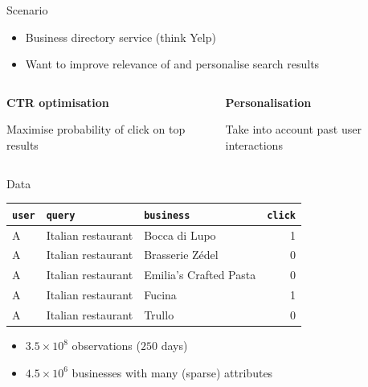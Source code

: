 \documentclass[12pt,aspectratio=169]{beamer}
\begin{document}
\begin{frame}{Scenario}
    \begin{itemize}
        \item Business directory service (think Yelp)
        \item Want to improve relevance of and personalise search results
    \end{itemize}
    \vfill\pause
    \begin{columns}
        \begin{column}{0.5\textwidth}
            \begin{center}
                \large\bf%
                CTR optimisation
            \end{center}
            Maximise probability of click on top results
        \end{column}
        \begin{column}{0.5\textwidth}
            \begin{center}
                \large\bf%
                Personalisation
            \end{center}
            Take into account past user interactions
        \end{column}
    \end{columns}
\end{frame}

\begin{frame}{Data}
    \begin{center}
        \begin{tabular}{lllr}
            \toprule
            \texttt{user} & \texttt{query}     & \texttt{business}      & \texttt{click} \\
            \midrule
            A             & Italian restaurant & Bocca di Lupo          & 1              \\
            A             & Italian restaurant & Brasserie Zédel        & 0              \\
            A             & Italian restaurant & Emilia's Crafted Pasta & 0              \\
            A             & Italian restaurant & Fucina                 & 1              \\
            A             & Italian restaurant & Trullo                 & 0              \\
            \bottomrule
        \end{tabular}
    \end{center}
    \vfill
    \begin{itemize}
        \item $3.5 \times 10^{8}$ observations ($250$ days)
        \item $4.5 \times 10^{6}$ businesses with many (sparse) attributes
    \end{itemize}
\end{frame}
\end{document}
